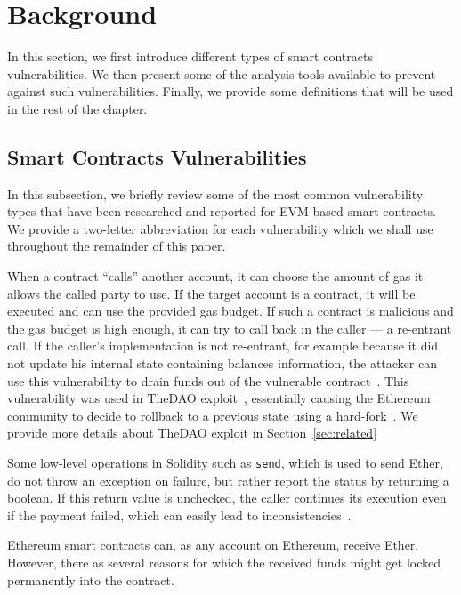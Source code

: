 \section{Background}
\label{sec:background} 
In this section, we first introduce different types of smart contracts vulnerabilities.
We then present some of the analysis tools available to prevent against such vulnerabilities.
Finally, we provide some definitions that will be used in the rest of the chapter.

\subsection{Smart Contracts Vulnerabilities}
\label{ssec:vulnerability-types}
In this subsection, we briefly review some of the most common vulnerability types that have been researched and reported for EVM-based smart contracts. We provide a two-letter abbreviation for each vulnerability which we shall use throughout the remainder of this paper.

\point{\reentrancy~(\vre)}
When a contract ``calls'' another account, it can choose the amount of gas it allows the called party to use. If the target account is a contract, it will be executed and can use the provided gas budget. If such a contract is malicious and the gas budget is high enough, it can try to call back in the caller --- a re-entrant call. If the caller's implementation is not re-entrant, for example because it did not update his internal state containing balances information, the attacker can use this vulnerability to drain funds out of the vulnerable contract~\cite{Luu2016a,DBLP:conf/ndss/KalraGDS18,Tsankov2018}.
This vulnerability was used in TheDAO exploit~\cite{Securities2017}, essentially causing the Ethereum community to decide to rollback to a previous state using a hard-fork~\cite{mehar2019understanding}. We provide more details about TheDAO exploit in Section~\ref{sec:related}

\point{\unhandledexceptions~(\vue)}
Some low-level operations in Solidity such as \lstinline{send}, which is used to send Ether, do not throw an exception on failure, but rather report the status by returning a boolean. If this return value is unchecked, the caller continues its execution even if the payment failed, which can easily lead to inconsistencies~\cite{Brent2018,Luu2016a,Tikhomirov2017,DBLP:conf/ndss/KalraGDS18}.

\point{\lockedether~(\vle)}
Ethereum smart contracts can, as any account on Ethereum, receive Ether. However, there as several reasons for which the received funds might get locked permanently into the contract.

